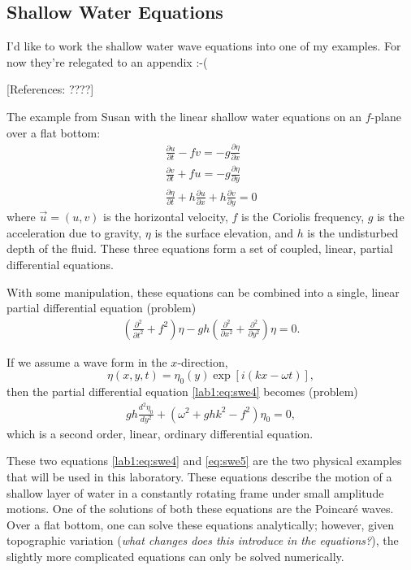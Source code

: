 \subsection{Shallow Water Equations}
\label{lab1:ap:swe}

I'd like to work the shallow water wave equations into one of my
examples.  For now they're relegated to an appendix :-(

[References: ????]

The example from Susan with the linear
shallow water equations on an $f$-plane over a flat bottom:
\begin{eqnarray}
  \frac{\partial u}{\partial t} - fv = -g \frac{\partial
    \eta}{\partial x}  
  \label{lab1:eq:swe1} \\
  \frac{\partial v}{\partial t} + fu = -g \frac{\partial
    \eta}{\partial y}
  \label{lab1:eq:swe2} \\
  \frac{\partial \eta}{\partial t} + h\frac{\partial u}{\partial x} +
  h\frac{\partial v}{\partial y} = 0 
  \label{lab1:eq:swe3}
\end{eqnarray}
where $\vec{u}=(u,v)$ is the horizontal velocity, $f$ is the
Coriolis frequency, $g$ is the acceleration due to gravity, $\eta$
is the surface elevation, and $h$ is the undisturbed depth of the
fluid.  These three equations form a set of coupled, linear, partial
differential equations.

With some manipulation, these equations can be combined into a
single, linear partial differential equation (problem)
\begin{eqnarray}
  \left( \frac{\partial^2}{\partial t^2} + f^2 \right) \eta - gh
  \left( \frac{\partial^2}{\partial x^2} + \frac{\partial^2}{\partial
      y^2} \right) \eta = 0. \label{lab1:eq:swe4}
\end{eqnarray}

If we assume a wave form in the $x$-direction, 
\[
  \eta(x,y,t) = \eta_0(y) \exp [i(kx-\omega t)], 
\]
then the partial differential equation \eqref{lab1:eq:swe4} becomes
(problem) 
\begin{eqnarray}
  gh \frac{d^2\eta_0}{dy^2} + (\omega^2+ghk^2-f^2)\eta_0 = 0,
  \label{lab1:eq:swe5} 
\end{eqnarray}
which is a second order, linear, ordinary differential equation.

These two equations \eqref{lab1:eq:swe4} and \eqref{eq:swe5} are the two
physical examples that will be used in this laboratory.  These
equations describe the motion of a shallow layer of water in a
constantly rotating frame under small amplitude motions.  One of the
solutions of both these equations are the Poincar\'e waves.  Over a
flat bottom, one can solve these equations analytically; however,
given topographic variation ({\em what changes does this introduce
  in the equations?}), the slightly more complicated equations can
only be solved numerically.

